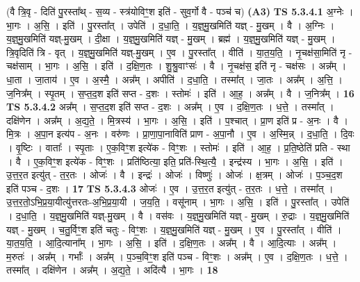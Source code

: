 \documentclass[17pt]{extarticle}
\begin{document}
                  \newline
                      (वै त्रि॒वृ - दिति॑ पु॒रस्ता᳚थ् - स॒व्य - स्त्र॑योविꣳ॒॒श इति॑ - सुव॒र्गो वै - पञ्च॑ च)  \textbf{(A3)} \newline \newline
                                \textbf{ TS 5.3.4.1} \newline
                  अ॒ग्नेः । भा॒गः । अ॒सि॒ । इति॑ । पु॒रस्ता᳚त् । उपेति॑ । द॒धा॒ति॒ । य॒ज्ञ्॒मु॒खमिति॑ यज्ञ् - मु॒खम् । वै । अ॒ग्निः । य॒ज्ञ्॒मु॒खमिति॑ यज्ञ्-मु॒खम् । दी॒क्षा । य॒ज्ञ्॒मु॒खमिति॑ यज्ञ् - मु॒खम् । ब्रह्म॑ । य॒ज्ञ्॒मु॒खमिति॑ यज्ञ् - मु॒खम् । त्रि॒वृदिति॑ त्रि - वृत् । य॒ज्ञ्॒मु॒खमिति॑ यज्ञ्-मु॒खम् । ए॒व । पु॒रस्ता᳚त् । वीति॑ । या॒त॒य॒ति॒ । नृ॒चक्ष॑सा॒मिति॑ नृ - चक्ष॑साम् । भा॒गः । अ॒सि॒ । इति॑ । द॒क्षि॒ण॒तः । शु॒श्रु॒वाꣳसः॑ । वै । नृ॒चक्ष॑स॒ इति॑ नृ - चक्ष॑सः । अन्न᳚म् । धा॒ता । जा॒ताय॑ । ए॒व । अ॒स्मै॒ । अन्न᳚म् । अपीति॑ । द॒धा॒ति॒ । तस्मा᳚त् । जा॒तः । अन्न᳚म् । अ॒त्ति॒ । ज॒नित्र᳚म् । स्पृ॒तम् । स॒प्त॒द॒श इति॑ सप्त - द॒शः । स्तोमः॑ । इति॑ । आ॒ह॒ । अन्न᳚म् । वै । ज॒नित्र᳚म् । \textbf{  16} \newline
                  \newline
                                \textbf{ TS 5.3.4.2} \newline
                  अन्न᳚म् । स॒प्त॒द॒श इति॑ सप्त - द॒शः । अन्न᳚म् । ए॒व । द॒क्षि॒ण॒तः । ध॒त्ते॒ । तस्मा᳚त् । दक्षि॑णेन । अन्न᳚म् । अ॒द्य॒ते॒ । मि॒त्रस्य॑ । भा॒गः । अ॒सि॒ । इति॑ । प॒श्चात् । प्रा॒ण इति॑ प्र - अ॒नः । वै । मि॒त्रः । अ॒पा॒न इत्य॑प - अ॒नः । वरु॑णः । प्रा॒णा॒पा॒नाविति॑ प्राण - अ॒पा॒नौ । ए॒व । अ॒स्मि॒न्न् । द॒धा॒ति॒ । दि॒वः । वृ॒ष्टिः । वाताः᳚ । स्पृ॒ताः । ए॒क॒विꣳ॒॒श इत्ये॑क - विꣳ॒॒शः । स्तोमः॑ । इति॑ । आ॒ह॒ । प्र॒ति॒ष्ठेति॑ प्रति - स्था । वै । ए॒क॒विꣳ॒॒श इत्ये॑क - विꣳ॒॒शः । प्रति॑ष्ठित्या॒ इति॒ प्रति॑-स्थि॒त्यै॒ । इन्द्र॑स्य । भा॒गः । अ॒सि॒ । इति॑ । उ॒त्त॒र॒त इत्यु॑त् - त॒र॒तः । ओजः॑ । वै । इन्द्रः॑ । ओजः॑ । विष्णुः॑ । ओजः॑ । क्ष॒त्रम् । ओजः॑ । प॒ञ्च॒द॒श इति॑ पञ्च - द॒शः । \textbf{  17} \newline
                  \newline
                                \textbf{ TS 5.3.4.3} \newline
                  ओजः॑ । ए॒व । उ॒त्त॒र॒त इत्यु॑त् - त॒र॒तः । ध॒त्ते॒ । तस्मा᳚त् । उ॒त्त॒र॒तो॒ऽभि॒प्र॒या॒यीत्यु॑त्तरतः-अ॒भि॒प्र॒या॒यी । ज॒य॒ति॒ । वसू॑नाम् । भा॒गः । अ॒सि॒ । इति॑ । पु॒रस्ता᳚त् । उपेति॑ । द॒धा॒ति॒ । य॒ज्ञ्॒मु॒खमिति॑ यज्ञ्-मु॒खम् । वै । वस॑वः । य॒ज्ञ्॒मु॒खमिति॑ यज्ञ् - मु॒खम् । रु॒द्राः । य॒ज्ञ्॒मु॒खमिति॑ यज्ञ् - मु॒खम् । च॒तु॒र्विꣳ॒॒श इति॑ चतुः - विꣳ॒॒शः । य॒ज्ञ्॒मु॒खमिति॑ यज्ञ् - मु॒खम् । ए॒व । पु॒रस्ता᳚त् । वीति॑ । या॒त॒य॒ति॒ । आ॒दि॒त्याना᳚म् । भा॒गः । अ॒सि॒ । इति॑ । द॒क्षि॒ण॒तः । अन्न᳚म् । वै । आ॒दि॒त्याः । अन्न᳚म् । म॒रुतः॑ । अन्न᳚म् । गर्भाः᳚ । अन्न᳚म् । प॒ञ्च॒विꣳ॒॒श इति॑ पञ्च - विꣳ॒॒शः । अन्न᳚म् । ए॒व । द॒क्षि॒ण॒तः । ध॒त्ते॒ । तस्मा᳚त् । दक्षि॑णेन । अन्न᳚म् । अ॒द्य॒ते॒ । अदि॑त्यै । भा॒गः । \textbf{  18} \newline
\end{document}
